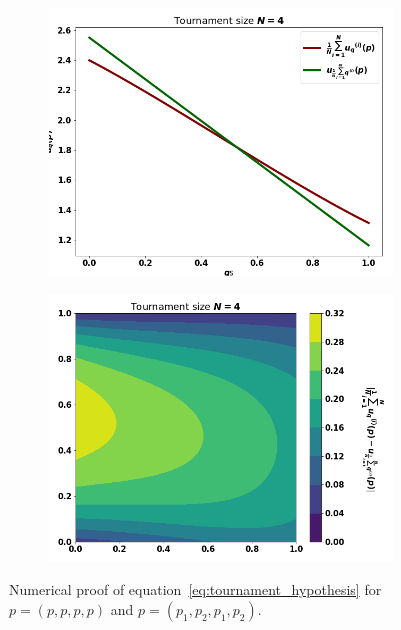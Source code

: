 \documentclass[10pt]{article}
\begin{document}
\begin{figure}[!htbp]
    \begin{center}
        \begin{subfigure}{0.45\textwidth}
            \includegraphics[width=\linewidth]{img/mean_vs_average.png}
        \end{subfigure}
        \begin{subfigure}{0.45\textwidth}
            \includegraphics[width=\linewidth]{img/mean_vs_average_two.png}
        \end{subfigure}
    \end{center}
    \caption{Numerical proof of equation~\ref{eq:tournament_hypothesis} for \(p=(p, p, p, p)\)
    and \(p= (p_1, p_2, p_1, p_2)\).}
    \label{fig:hypothesis}
\end{figure}
\end{document}
